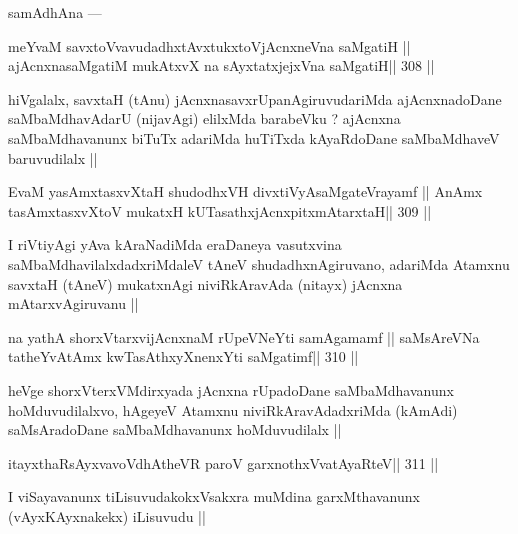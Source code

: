 \begin{artha}
samAdhAna ---
\end{artha}

\begin{shl}
meYvaM savxtoV\s vavudadhxtAvxtukxtoV\s jAcnxneVna saMgatiH ||
ajAcnxnasaMgatiM mukAtxvX na sAyxtatxjejxVna saMgatiH\hfill || 308 ||
\end{shl}

\begin{artha}
hiVgalalx, savxtaH (tAnu) jAcnxnasavxrUpanAgiruvudariMda ajAcnxnadoDane saMbaMdhavAdarU (nijavAgi) elilxMda barabeVku ? ajAcnxna saMbaMdhavanunx biTuTx adariMda huTiTxda kAyaRdoDane saMbaMdhaveV baruvudilalx ||
\end{artha}

\begin{shl}
EvaM yasAmxtasxvXtaH shudodhxVH divxtiVyAsaMgateVrayamf ||
AnAmx tasAmxtasxvXtoV mukatxH kUTasathxjAcnxpitxmAtarxtaH\footnotemark[1]\hfill || 309 ||
\end{shl}

\begin{artha}
I riVtiyAgi yAva kAraNadiMda eraDaneya vasutxvina saMbaMdhavilalxdadxriMdaleV tAneV shudadhxnAgiruvano, adariMda Atamxnu savxtaH (tAneV) mukatxnAgi niviRkAravAda (nitayx) jAcnxna mAtarxvAgiruvanu ||
\end{artha}

\begin{shl}
na yathA shorxVtarxvijAcnxnaM rUpeVNeYti samAgamamf ||
saMsAreVNa tatheYvA\s\s tAmx kwTasAthxyXnenxYti saMgatimf\hfill || 310 ||
\end{shl}

\begin{artha}
heVge shorxVterxVMdirxyada jAcnxna rUpadoDane saMbaMdhavanunx hoMduvudilalxvo, hAgeyeV Atamxnu niviRkAravAdadxriMda (kAmAdi) saMsAradoDane saMbaMdhavanunx hoMduvudilalx ||
\end{artha}

\begin{shl}
itayxthaRsAyxvavoVdhAtheVR paroV garxnothxV\s vatAyaRteV\hfill || 311 ||
\end{shl}

\begin{artha}
I viSayavanunx tiLisuvudakokxVsakxra muMdina garxMthavanunx (vAyxKAyxnakekx) iLisuvudu ||
\end{artha}


